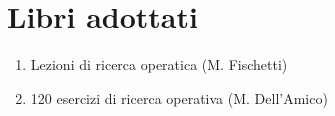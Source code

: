 \documentclass[\main/main.tex]{subfiles}
\begin{document}
 \section{Libri adottati}

\begin{enumerate} 
\item Lezioni di ricerca operatica (M. Fischetti)
\item 120 esercizi di ricerca operativa (M. Dell'Amico)
\end{enumerate}
\end{document}
